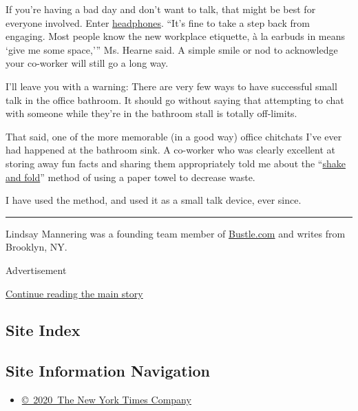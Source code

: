 If you're having a bad day and don't want to talk, that might be best
for everyone involved. Enter
\href{https://www.nytimes3xbfgragh.onion/2015/12/24/fashion/headphones-now-playing-nothing.html}{headphones}.
``It's fine to take a step back from engaging. Most people know the new
workplace etiquette, à la earbuds in means `give me some space,''' Ms.
Hearne said. A simple smile or nod to acknowledge your co-worker will
still go a long way.

I'll leave you with a warning: There are very few ways to have
successful small talk in the office bathroom. It should go without
saying that attempting to chat with someone while they're in the
bathroom stall is totally off-limits.

That said, one of the more memorable (in a good way) office chitchats
I've ever had happened at the bathroom sink. A co-worker who was clearly
excellent at storing away fun facts and sharing them appropriately told
me about the ``\href{http://shakeandfold.org/}{shake and fold}'' method
of using a paper towel to decrease waste.

I have used the method, and used it as a small talk device, ever since.

\begin{center}\rule{0.5\linewidth}{\linethickness}\end{center}

Lindsay Mannering was a founding team member of
\href{https://www.bustle.com/}{Bustle.com} and writes from Brooklyn, NY.

Advertisement

\protect\hyperlink{after-bottom}{Continue reading the main story}

\hypertarget{site-index}{%
\subsection{Site Index}\label{site-index}}

\hypertarget{site-information-navigation}{%
\subsection{Site Information
Navigation}\label{site-information-navigation}}

\begin{itemize}
\tightlist
\item
  \href{https://help.nytimes3xbfgragh.onion/hc/en-us/articles/115014792127-Copyright-notice}{©~2020~The
  New York Times Company}
\end{itemize}

